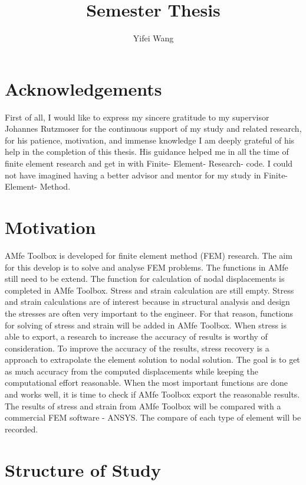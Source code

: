 \documentclass{article}
\title{Semester Thesis}
\author{Yifei Wang}
\begin{document}
\maketitle

\section{Acknowledgements}
First of all, I would like to express my sincere gratitude to my supervisor Johannes Rutzmoser for the continuous support of my study and related research, for his patience, motivation, and immense knowledge I am deeply grateful of his help in the completion of this thesis.  His guidance helped me in all the time of finite element research and get in with Finite- Element- Research- code. I could not have imagined having a better advisor and mentor for my study in Finite- Element- Method. 

\section{Motivation}
AMfe Toolbox is developed for finite element method (FEM) research. The aim for this develop is to solve and analyse FEM problems. The functions in AMfe still need to be extend. The function for calculation of nodal displacements is completed in AMfe Toolbox. Stress and strain calculation are still empty. Stress and strain calculations are of interest because in structural analysis and design the stresses are often very important to the engineer. For that reason, functions for solving of stress and strain will be added in AMfe Toolbox. When stress is able to export, a research to increase the accuracy of results is worthy of consideration. To improve the accuracy of the results, stress recovery is a approach to extrapolate the element solution to nodal solution. The goal is to get as much accuracy from the computed displacements while keeping the computational effort reasonable. When the most important functions are done and works well, it is time to check if AMfe Toolbox export the reasonable results. The results of stress and strain from AMfe Toolbox will be compared with a commercial FEM software - ANSYS. The compare of each type of element will be recorded.

\section{Structure of Study}
\end{document}
